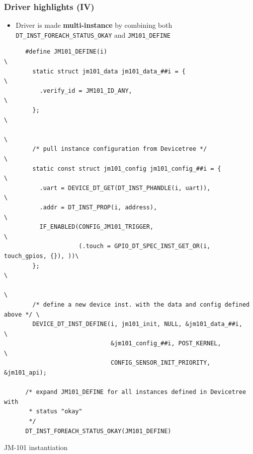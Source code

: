 \documentclass[handout]{beamer}
\begin{document}
\begin{frame}[fragile]
  \frametitle{Driver highlights (IV)}

  \begin{itemize}
    \item Driver is made \textbf{multi-instance} by combining both
          \texttt{DT\_INST\_FOREACH\_STATUS\_OKAY} and \texttt{JM101\_DEFINE}
  \end{itemize}

  \begin{listing}[H]
    \begin{verbatim}
      #define JM101_DEFINE(i)                                                  \
        static struct jm101_data jm101_data_##i = {                            \
          .verify_id = JM101_ID_ANY,                                           \
        };                                                                     \
                                                                               \
        /* pull instance configuration from Devicetree */                      \
        static const struct jm101_config jm101_config_##i = {                  \
          .uart = DEVICE_DT_GET(DT_INST_PHANDLE(i, uart)),                     \
          .addr = DT_INST_PROP(i, address),                                    \
          IF_ENABLED(CONFIG_JM101_TRIGGER,                                     \
                     (.touch = GPIO_DT_SPEC_INST_GET_OR(i, touch_gpios, {}), ))\
        };                                                                     \
                                                                               \
        /* define a new device inst. with the data and config defined above */ \
        DEVICE_DT_INST_DEFINE(i, jm101_init, NULL, &jm101_data_##i,            \
                              &jm101_config_##i, POST_KERNEL,                  \
                              CONFIG_SENSOR_INIT_PRIORITY, &jm101_api);

      /* expand JM101_DEFINE for all instances defined in Devicetree with
       * status "okay"
       */
      DT_INST_FOREACH_STATUS_OKAY(JM101_DEFINE)
    \end{verbatim}
    \caption{JM-101 instantiation}
  \end{listing}
\end{frame}
\end{document}

